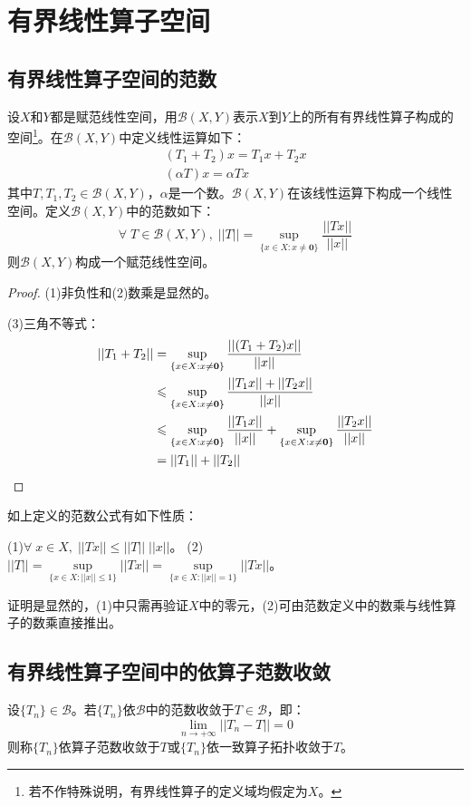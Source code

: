 \section{有界线性算子空间}

\subsection{有界线性算子空间的范数}
\begin{theorem}
	设$X$和$Y$都是赋范线性空间，用$\mathscr{B}(X,Y)$表示$X$到$Y$上的所有有界线性算子构成的空间\footnote{若不作特殊说明，有界线性算子的定义域均假定为$X$。}。在$\mathscr{B}(X,Y)$中定义线性运算如下：
	\begin{gather*}
		(T_1+T_2)x=T_1x+T_2x \\
		(\alpha T)x=\alpha Tx
	\end{gather*}
	其中$T,T_1,T_2\in\mathscr{B}(X,Y)$，$\alpha$是一个数。$\mathscr{B}(X,Y)$在该线性运算下构成一个线性空间。定义$\mathscr{B}(X,Y)$中的范数如下：
	\begin{equation*}
		\forall\;T\in\mathscr{B}(X,Y),\;||T||=\sup_{\{x\in X:x\ne\mathbf{0}\}}\frac{||Tx||}{||x||}
	\end{equation*}
	则$\mathscr{B}(X,Y)$构成一个赋范线性空间。
\end{theorem}
\begin{proof}
	(1)非负性和(2)数乘是显然的。\par
	(3)三角不等式：
	\begin{align*}
		||T_1+T_2||
		&=\sup_{\{x\in X:x\ne\mathbf{0}\}}\frac{||(T_1+T_2)x||}{||x||} \\
		&\leqslant\sup_{\{x\in X:x\ne\mathbf{0}\}}\frac{||T_1x||+||T_2x||}{||x||} \\
		&\leqslant\sup_{\{x\in X:x\ne\mathbf{0}\}}\frac{||T_1x||}{||x||}+
		\sup_{\{x\in X:x\ne\mathbf{0}\}}\frac{||T_2x||}{||x||} \\
		&=||T_1||+||T_2||\qedhere  
	\end{align*}
\end{proof}
如上定义的范数公式有如下性质：
\begin{theorem}
	(1)\;$\forall\;x\in X,\;||Tx||\leqslant||T||\;||x||$。
	(2)\;$||T||=\underset{\{x\in X:||x||\leqslant1\}}{\sup}||Tx||=\underset{\{x\in X:||x||=1\}}{\sup}||Tx||$。
\end{theorem}
证明是显然的，(1)中只需再验证$X$中的零元，(2)可由范数定义中的数乘与线性算子的数乘直接推出。

\subsection{有界线性算子空间中的依算子范数收敛}
\begin{definition}
	设$\{T_n\}\in\mathscr{B}$。若$\{T_n\}$依$\mathscr{B}$中的范数收敛于$T\in\mathscr{B}$，即：
	\begin{equation*}
		\lim_{n\to+\infty}||T_n-T||=0
	\end{equation*}
	则称$\{T_n\}$依算子范数收敛于$T$或$\{T_n\}$依一致算子拓扑收敛于$T$。
\end{definition}

